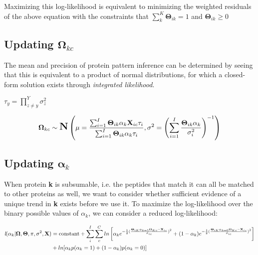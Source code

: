 \documentclass[12pt]{article}
\begin{document}
Maximizing this log-likelihood is equivalent to minimizing the weighted residuals of the above equation with the constraints that $\sum_{k}^{K}\mathbf{\Theta}_{ik} = 1$ and $\mathbf{\Theta}_{ik} \ge 0$
\subsection*{Updating $\mathbf{\Omega}_{kc}$}

The mean and precision of protein pattern inference can be determined by seeing that this is equivalent to a product of normal distributions, for which a closed-form solution exists through \textit{integrated likelihood}.

$\tau_{y} = \prod_{z \neq y}^{Y}\sigma^{2}_{z}$

\begin{align}
\mathbf{\Omega}_{kc} \sim \mbox{\Large \textbf{N}}\left(\mu = \frac{\sum_{i = 1}^{I}\mathbf{\Theta}_{ik}\alpha_{k}\textbf{X}_{ic}\tau_{i}}{\sum_{i = 1}^{I}\mathbf{\Theta}_{ik}\alpha_{k}\tau_{i}}, \sigma^{2} =  \left(\sum_{i = 1}^{I}\frac{\mathbf{\Theta}_{ik}\alpha_{k}}{\sigma^{2}_{i}}\right)^{-1} \right)
\end{align}

\subsection*{Updating $\mathbf{\alpha}_{k}$}

When protein \textbf{k} is subsumable, i.e. the peptides that match it can all be matched to other proteins as well, we want to consider whether sufficient evidence of a unique trend in \textbf{k} exists before we use it.  To maximize the log-likelihood over the binary possible values of $\alpha_{k}$, we can consider a reduced log-likelihood:

\begin{align}
\textit{l}(\alpha_{k} | \mathbf{\Omega}, \mathbf{\Theta}, \pi, \sigma^{2}, \textbf{X}) &= \text{constant} + \sum_{i}^{I}\sum_{c}^{C}ln\left[\alpha_{k}e^{-\frac{1}{2}(\frac{\mathbf{\Theta}_{iK}\alpha_{k  = 1}\mathbf{\Omega}_{Kc} - \textbf{X}_{ic}}{\sigma_{ic}})^2} + (1-\alpha_{k})e^{-\frac{1}{2}(\frac{\mathbf{\Theta}_{iK}\alpha_{k  = 0}\mathbf{\Omega}_{Kc} - \textbf{X}_{ic}}{\sigma_{ic}})^2}\right]\notag\\
&+ ln[\alpha_{k}p(\alpha_{k} = 1) + (1-\alpha_{k})p(\alpha_{k} = 0)]\notag
\end{align}
\end{document}
